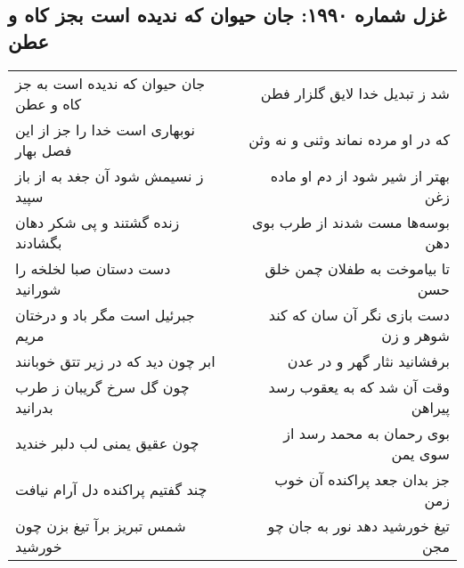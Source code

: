 \begin{center}
\section*{غزل شماره ۱۹۹۰: جان حیوان که ندیده است بجز کاه و عطن}
\label{sec:1990}
\begin{longtable}{l p{0.5cm} r}
جان حیوان که ندیده است به جز کاه و عطن
&&
شد ز تبدیل خدا لایق گلزار فطن
\\
نوبهاری است خدا را جز از این فصل بهار
&&
که در او مرده نماند وثنی و نه وثن
\\
ز نسیمش شود آن جغد به از باز سپید
&&
بهتر از شیر شود از دم او ماده زغن
\\
زنده گشتند و پی شکر دهان بگشادند
&&
بوسه‌ها مست شدند از طرب بوی دهن
\\
دست دستان صبا لخلخه را شورانید
&&
تا بیاموخت به طفلان چمن خلق حسن
\\
جبرئیل است مگر باد و درختان مریم
&&
دست بازی نگر آن سان که کند شوهر و زن
\\
ابر چون دید که در زیر تتق خوبانند
&&
برفشانید نثار گهر و در عدن
\\
چون گل سرخ گریبان ز طرب بدرانید
&&
وقت آن شد که به یعقوب رسد پیراهن
\\
چون عقیق یمنی لب دلبر خندید
&&
بوی رحمان به محمد رسد از سوی یمن
\\
چند گفتیم پراکنده دل آرام نیافت
&&
جز بدان جعد پراکنده آن خوب زمن
\\
شمس تبریز برآ تیغ بزن چون خورشید
&&
تیغ خورشید دهد نور به جان چو مجن
\\
\end{longtable}
\end{center}
